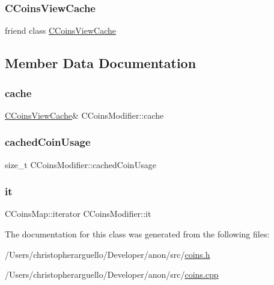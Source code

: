 \subsubsection{\texorpdfstring{C\+Coins\+View\+Cache}{CCoinsViewCache}}
{\footnotesize\ttfamily friend class \mbox{\hyperlink{class_c_coins_view_cache}{C\+Coins\+View\+Cache}}\hspace{0.3cm}{\ttfamily [friend]}}



\subsection{Member Data Documentation}
\mbox{\label{class_c_coins_modifier_a3f01272c4b88d2051e0845fa6282c67b}} 
\subsubsection{\texorpdfstring{cache}{cache}}
{\footnotesize\ttfamily \mbox{\hyperlink{class_c_coins_view_cache}{C\+Coins\+View\+Cache}}\& C\+Coins\+Modifier\+::cache\hspace{0.3cm}{\ttfamily [private]}}

\mbox{\label{class_c_coins_modifier_a7b392fa8adb2545b950256c57e04cda2}} 
\subsubsection{\texorpdfstring{cached\+Coin\+Usage}{cachedCoinUsage}}
{\footnotesize\ttfamily size\+\_\+t C\+Coins\+Modifier\+::cached\+Coin\+Usage\hspace{0.3cm}{\ttfamily [private]}}

\mbox{\label{class_c_coins_modifier_a0c524598ef4c00f3eb958946c620683a}} 
\subsubsection{\texorpdfstring{it}{it}}
{\footnotesize\ttfamily C\+Coins\+Map\+::iterator C\+Coins\+Modifier\+::it\hspace{0.3cm}{\ttfamily [private]}}



The documentation for this class was generated from the following files\+:\begin{DoxyCompactItemize}
\item 
/\+Users/christopherarguello/\+Developer/anon/src/\mbox{\hyperlink{coins_8h}{coins.\+h}}\item 
/\+Users/christopherarguello/\+Developer/anon/src/\mbox{\hyperlink{coins_8cpp}{coins.\+cpp}}\end{DoxyCompactItemize}
